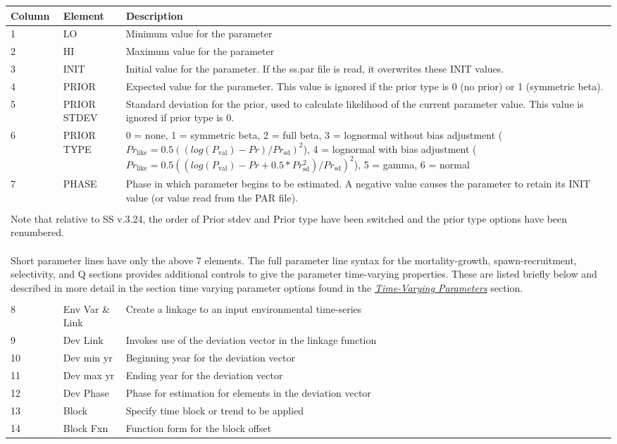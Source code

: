 \hypertarget{Prior}{} \hypertarget{paraOrder}{}
\begin{center}
	\begin{tabular}{p{2cm} p{3cm} p{10cm}}
		Column & Element & Description\\
		\hline
		1 & LO & Minimum value for the parameter\\
		2 & HI & Maximum value for the parameter\\
		3 & INIT & Initial value for the parameter.  If the ss.par file is read, it overwrites these INIT values.\\
		4 & PRIOR & Expected value for the parameter.  This value is ignored if the prior type is 0 (no prior) or 1 (symmetric beta).\\
		5 & PRIOR STDEV & Standard deviation for the prior, used to calculate likelihood of the current parameter value. This value is ignored if prior type is 0. \\
		6 & PRIOR TYPE  & 0 = none, 1 = symmetric beta, 2 = full beta, 3 = lognormal without bias adjustment ($Pr_{\text{like}} = 0.5((log(P_{\text{val}}) -Pr)/Pr_{\text{sd}})^2$), 4 = lognormal with bias adjustment ($Pr_{\text{like}} = 0.5((log(P_{\text{val}}) -Pr+0.5*Pr_{\text{sd}}^2)/Pr_{\text{sd}})^2$), 5 = gamma, 6 = normal \\
		7 & PHASE & Phase in which parameter begins to be estimated.  A negative value causes the parameter to retain its INIT value (or value read from the PAR file).\\
		\hline
		 & & \\
		\multicolumn{3}{l}{\parbox{16cm}{Note that relative to SS v.3.24,  the order of Prior stdev and Prior type have been switched and the prior type options have been renumbered.
		\\\\
		Short parameter lines have only the above 7 elements.  The full parameter line syntax for the mortality-growth, spawn-recruitment, selectivity, and Q sections provides additional controls to give the parameter time-varying properties.  These are listed briefly below and described in more detail in the section time varying parameter options found in the \hyperlink{TVpara}{\textit{Time-Varying Parameters}} section.
		}}\\
		 & & \\
		\hline
		8  & Env Var \& Link & Create a linkage to an input environmental time-series\\
		9  & Dev Link & Invokes use of the deviation vector in the linkage function \\
		10 & Dev min yr & Beginning year for the deviation vector \\
		11 & Dev max yr & Ending year for the deviation vector\\
		12 & Dev Phase & Phase for estimation for elements in the deviation vector \\
		13 & Block & Specify time block or trend to be applied \\
		14 & Block Fxn & Function form for the block offset\\
		\hline
	\end{tabular}
\end{center}

